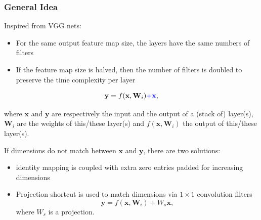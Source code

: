 \begin{frame}
	\frametitle{General Idea}
	
	Inspired from VGG nets:
	
	\smallskip 
	\begin{itemize}
		\item For the same output feature map size, the layers have the same numbers of filters
		\item If the feature map size is halved, then the number of filters is doubled to preserve the time complexity per layer
	\end{itemize}
$$
\textbf{y} = f(\textbf{x}, \textbf{W}_i) \textcolor{blue}{+ \textbf{x}},
$$

\smallskip 
where $\textbf{x}$ and $\textbf{y}$ are respectively the input and the output of a (stack of) layer(s), $\textbf{W}_i$ are the weights of this/these layer(s) and $f(\textbf{x}, \textbf{W}_i)$ the output of this/these layer(s).

\bigskip 

If dimensions do not match between $\textbf{x}$ and $\textbf{y}$, there are two solutions: 
\begin{itemize}
	\item identity mapping is coupled with extra zero entries padded for increasing dimensions
	\item Projection shortcut is used to match dimensions via $1 \times 1$ convolution filters
	$$
	\textbf{y} = f(\textbf{x}, \textbf{W}_i) + W_s \textbf{x},
	$$
	where $W_s$ is a projection.
\end{itemize}

\end{frame}


